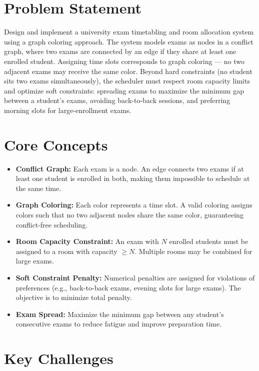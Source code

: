 \section{Problem Statement}

Design and implement a university exam timetabling and room allocation system using a graph coloring approach. The system models exams as nodes in a conflict graph, where two exams are connected by an edge if they share at least one enrolled student. Assigning time slots corresponds to graph coloring --- no two adjacent exams may receive the same color. Beyond hard constraints (no student sits two exams simultaneously), the scheduler must respect room capacity limits and optimize soft constraints: spreading exams to maximize the minimum gap between a student's exams, avoiding back-to-back sessions, and preferring morning slots for large-enrollment exams.

\section{Core Concepts}

\begin{itemize}
  \item \textbf{Conflict Graph:} Each exam is a node. An edge connects two exams if at least one student is enrolled in both, making them impossible to schedule at the same time.
  \item \textbf{Graph Coloring:} Each color represents a time slot. A valid coloring assigns colors such that no two adjacent nodes share the same color, guaranteeing conflict-free scheduling.
  \item \textbf{Room Capacity Constraint:} An exam with $N$ enrolled students must be assigned to a room with capacity $\geq N$. Multiple rooms may be combined for large exams.
  \item \textbf{Soft Constraint Penalty:} Numerical penalties are assigned for violations of preferences (e.g., back-to-back exams, evening slots for large exams). The objective is to minimize total penalty.
  \item \textbf{Exam Spread:} Maximize the minimum gap between any student's consecutive exams to reduce fatigue and improve preparation time.
\end{itemize}

\section{Key Challenges}

